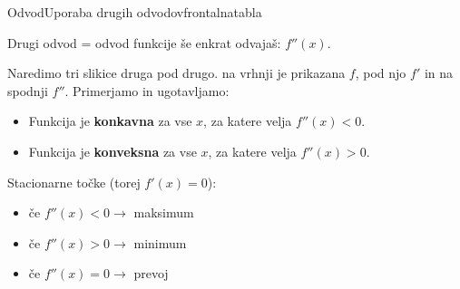 \begin{priprava}{}{}{Odvod}{Uporaba drugih odvodov}{frontalna}{tabla}


Drugi odvod = odvod funkcije še enkrat odvajaš: $ f''(x) $.

Naredimo tri slikice druga pod drugo. na vrhnji je prikazana $ f $, pod njo $ f' $ in na spodnji $ f'' $. Primerjamo in ugotavljamo:

\begin{itemize}
    \item Funkcija je \textbf{konkavna} za vse $ x $, za katere velja $ f''(x) < 0 $.
    \item Funkcija je \textbf{konveksna} za vse $ x $, za katere velja $ f''(x) > 0 $.
\end{itemize}

Stacionarne točke (torej $ f'(x) = 0 $):
\begin{itemize}
    \item če $ f''(x) < 0 \rightarrow $ maksimum
    \item če $ f''(x) > 0 \rightarrow $ minimum
    \item če $ f''(x) = 0 \rightarrow $ prevoj
\end{itemize}

    
\end{priprava}